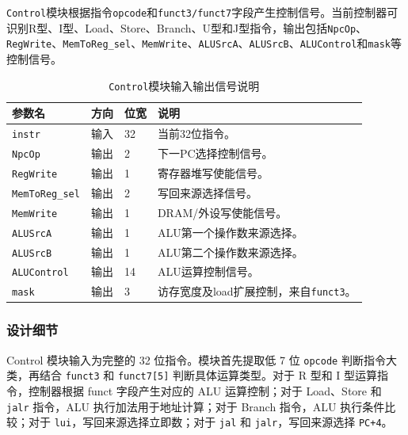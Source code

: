 \documentclass[12pt,a4paper]{ctexart}
\newcommand{\code}[1]{\texttt{#1}}
\begin{document}
\code{Control}模块根据指令\code{opcode}和\code{funct3/funct7}字段产生控制信号。当前控制器可识别R型、I型、Load、Store、Branch、U型和J型指令，输出包括\code{NpcOp}、\code{RegWrite}、\code{MemToReg\_sel}、\code{MemWrite}、\code{ALUSrcA}、\code{ALUSrcB}、\code{ALUControl}和\code{mask}等控制信号。

\begin{table}[H]
	\centering
	\caption{\code{Control}模块输入输出信号说明}
	\footnotesize
	\renewcommand{\arraystretch}{1.15}
	\begin{tabularx}{\textwidth}{p{3.2cm}p{1.5cm}p{2.1cm}X}
		\toprule
		参数名                  & 方向 & 位宽 & 说明                             \\
		\midrule
		\code{instr}         & 输入 & 32 & 当前32位指令。                       \\
		\code{NpcOp}         & 输出 & 2  & 下一PC选择控制信号。                    \\
		\code{RegWrite}      & 输出 & 1  & 寄存器堆写使能信号。                     \\
		\code{MemToReg\_sel} & 输出 & 2  & 写回来源选择信号。                      \\
		\code{MemWrite}      & 输出 & 1  & DRAM/外设写使能信号。                  \\
		\code{ALUSrcA}       & 输出 & 1  & ALU第一个操作数来源选择。                 \\
		\code{ALUSrcB}       & 输出 & 1  & ALU第二个操作数来源选择。                 \\
		\code{ALUControl}    & 输出 & 14 & ALU运算控制信号。                     \\
		\code{mask}          & 输出 & 3  & 访存宽度及load扩展控制，来自\code{funct3}。 \\
		\bottomrule
	\end{tabularx}
\end{table}

\subsubsection*{设计细节}

Control 模块输入为完整的 32 位指令。模块首先提取低 7 位 \code{opcode} 判断指令大类，再结合 \code{funct3} 和 \code{funct7[5]} 判断具体运算类型。对于 R 型和 I 型运算指令，控制器根据 funct 字段产生对应的 ALU 运算控制；对于 Load、Store 和 \code{jalr} 指令，ALU 执行加法用于地址计算；对于 Branch 指令，ALU 执行条件比较；对于 \code{lui}，写回来源选择立即数；对于 \code{jal} 和 \code{jalr}，写回来源选择 \code{PC+4}。
\end{document}
